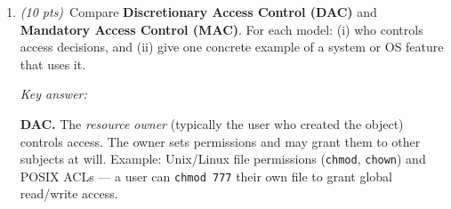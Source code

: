 \documentclass[11pt]{article}
\newif\ifanswers
\newcounter{writelinesi}
\newcommand{\writelines}[1]{%
  \par\vspace{4pt}%
  \setcounter{writelinesi}{0}%
  \loop\ifnum\value{writelinesi}<#1
    \par\noindent\rule{\linewidth}{0.4pt}\vspace{1.4em}%
    \stepcounter{writelinesi}%
  \repeat
  \par\vspace{4pt}}
\begin{document}
\begin{enumerate}[resume]
  \ifanswers
    \par\smallskip\textit{Key answer (any two of the following; 5 pts each):}
    \begin{itemize}[itemsep=2pt]
      \item \textbf{Stack canary.} The compiler inserts a random sentinel value
        (canary) between local buffers and the saved return address.  Before a function
        returns, the canary is checked; a mismatch aborts the process.
        \textit{Circumvention:} leak the canary value via a format-string or
        information-disclosure vulnerability, then overwrite it with the correct value
        when crafting the overflow payload.
      \item \textbf{Non-executable stack (NX / W\^{}X).} Pages are marked either
        writable or executable, never both.  Shellcode injected onto the stack cannot
        run.
        \textit{Circumvention:} return-oriented programming (ROP) — chain together
        existing executable code gadgets (``ret'' sequences in libraries) to build
        arbitrary computations without injecting new code.
      \item \textbf{Address Space Layout Randomization (ASLR).} The OS randomizes the
        base addresses of the stack, heap, and shared libraries at each execution.
        Hardcoded jump targets in the exploit become unreliable.
        \textit{Circumvention:} brute-force the address space (feasible on 32-bit);
        leak an address from a running process via a format-string or memory-disclosure
        bug to de-randomize the layout.
    \end{itemize}
    \par\smallskip
  \else
    \writelines{9}
  \fi

\item \textit{(10 pts)}~Compare \textbf{Discretionary Access Control (DAC)} and
  \textbf{Mandatory Access Control (MAC)}.  For each model: (i) who controls access
  decisions, and (ii) give one concrete example of a system or OS feature that uses it.

  \ifanswers
    \par\smallskip\textit{Key answer:}

    \textbf{DAC.}  The \emph{resource owner} (typically the user who created the
    object) controls access.  The owner sets permissions and may grant them to other
    subjects at will.  Example: Unix/Linux file permissions (\texttt{chmod},
    \texttt{chown}) and POSIX ACLs — a user can \texttt{chmod 777} their own file to
    grant global read/write access.


\end{enumerate}
\end{document}
